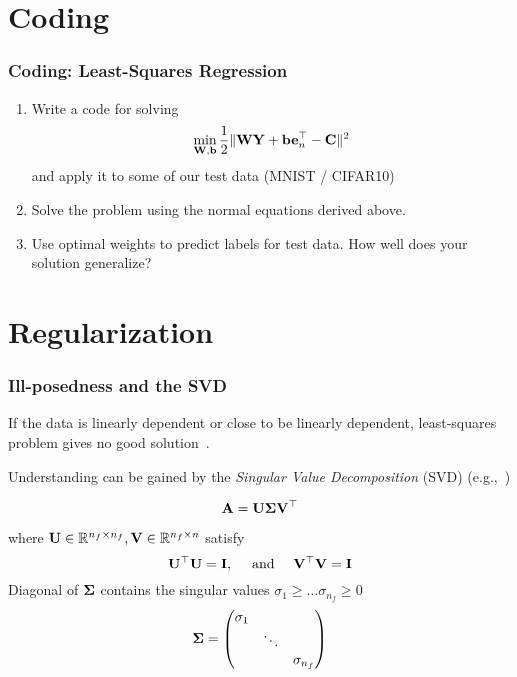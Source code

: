\documentclass[12pt,fleqn,beamer]{beamer}
\begin{document}
\section{Coding} %
\label{sec:coding}
\begin{frame}
	\frametitle{Coding: Least-Squares Regression}
	
	\begin{enumerate}
		\item Write a code for solving
		$$
		\min_{{\bf W},{\bf b}} {\frac 12}\| {\bf W}{\bf Y} + {\bf b} {\bf e}_n^\top - {\bf C} \|^2
		$$
		and apply it to some of our test data (MNIST / CIFAR10)
		
		\item Solve the problem using the normal equations derived above.
		
		\item Use optimal weights to predict labels for test data. How well does your solution generalize?
		
	\end{enumerate}
	
	\bigskip
	
\end{frame}

\section{Regularization} 
\label{sec:bias_variance}

\begin{frame}\frametitle{Ill-posedness and the SVD}

If the data is linearly dependent or close to be linearly dependent, least-squares problem gives no good solution~\cite{Hansen1998,Vogel2002,Hansen2010}.

Understanding can be gained by the \emph{Singular Value Decomposition} (SVD) (e.g.,~\cite[Ch. 8]{AscherGreif2011})

$$ {\bf A} = {\bf U} {\boldsymbol \Sigma} {\bf V}^{\top} $$

where ${\bf U} \in \mathbb{R}^{n_f\times n_f}, {\bf V}\in\mathbb{R}^{n_f \times n}$ satisfy
$$  {\bf U}^{\top} {\bf U} = {\bf I}, \quad \text{ and } \quad {\bf V}^{\top} {\bf V} = {\bf I} $$
Diagonal of ${\boldsymbol \Sigma}$ contains the singular values $\sigma_1 \geq ... \sigma_{n_f} \geq 0 $
$$ {\boldsymbol \Sigma} = \begin{pmatrix} \sigma_1  &  &  \\ &  \ddots &  \\ &  &  \sigma_{n_f} \end{pmatrix} $$

\end{frame}
\end{document}
